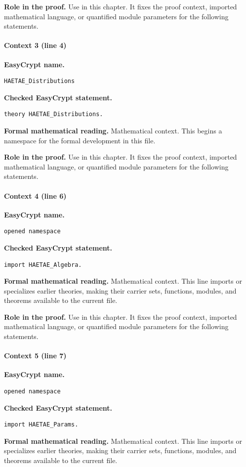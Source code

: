 \noindent\textbf{Role in the proof.}
Use in this chapter. It fixes the proof context, imported mathematical language, or quantified module parameters for the following statements.

\paragraph{Context 3 (line 4)}
\noindent\textbf{EasyCrypt name.}
\begin{lstlisting}[language=EasyCrypt,basicstyle=\ttfamily\scriptsize]
HAETAE_Distributions
\end{lstlisting}
\noindent\textbf{Checked EasyCrypt statement.}
\begin{lstlisting}[language=EasyCrypt,basicstyle=\ttfamily\scriptsize]
theory HAETAE_Distributions.
\end{lstlisting}
\noindent\textbf{Formal mathematical reading.}
Mathematical context. This begins a namespace for the formal development in this file.

\noindent\textbf{Role in the proof.}
Use in this chapter. It fixes the proof context, imported mathematical language, or quantified module parameters for the following statements.

\paragraph{Context 4 (line 6)}
\noindent\textbf{EasyCrypt name.}
\begin{lstlisting}[language=EasyCrypt,basicstyle=\ttfamily\scriptsize]
opened namespace
\end{lstlisting}
\noindent\textbf{Checked EasyCrypt statement.}
\begin{lstlisting}[language=EasyCrypt,basicstyle=\ttfamily\scriptsize]
import HAETAE_Algebra.
\end{lstlisting}
\noindent\textbf{Formal mathematical reading.}
Mathematical context. This line imports or specializes earlier theories, making their carrier sets, functions, modules, and theorems available to the current file.

\noindent\textbf{Role in the proof.}
Use in this chapter. It fixes the proof context, imported mathematical language, or quantified module parameters for the following statements.

\paragraph{Context 5 (line 7)}
\noindent\textbf{EasyCrypt name.}
\begin{lstlisting}[language=EasyCrypt,basicstyle=\ttfamily\scriptsize]
opened namespace
\end{lstlisting}
\noindent\textbf{Checked EasyCrypt statement.}
\begin{lstlisting}[language=EasyCrypt,basicstyle=\ttfamily\scriptsize]
import HAETAE_Params.
\end{lstlisting}
\noindent\textbf{Formal mathematical reading.}
Mathematical context. This line imports or specializes earlier theories, making their carrier sets, functions, modules, and theorems available to the current file.

